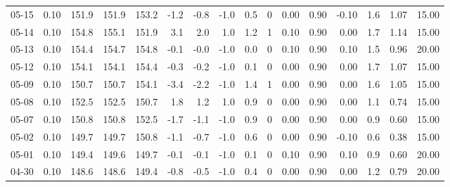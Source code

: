 \begin{threeparttable}
{\begin{tabular}{lrrrrrrrrrrrrrrr}
  05-15 &     0.10 & 151.9 & 151.9 & 153.2 &       -1.2 &           -0.8 &                     -1.0 &                 0.5 &              0 &       0.00 &      0.90 &          -0.10 &              1.6 &            1.07 &                  15.00 \\
  05-14 &     0.10 & 154.8 & 155.1 & 151.9 &        3.1 &            2.0 &                      1.0 &                 1.2 &              1 &       0.10 &      0.90 &           0.00 &              1.7 &            1.14 &                  15.00 \\
  05-13 &     0.10 & 154.4 & 154.7 & 154.8 &       -0.1 &           -0.0 &                     -1.0 &                 0.0 &              0 &       0.10 &      0.90 &           0.10 &              1.5 &            0.96 &                  20.00 \\
  05-12 &     0.10 & 154.1 & 154.1 & 154.4 &       -0.3 &           -0.2 &                     -1.0 &                 0.1 &              0 &       0.00 &      0.90 &           0.00 &              1.7 &            1.07 &                  15.00 \\
  05-09 &     0.10 & 150.7 & 150.7 & 154.1 &       -3.4 &           -2.2 &                     -1.0 &                 1.4 &              1 &       0.00 &      0.90 &           0.00 &              1.6 &            1.05 &                  15.00 \\
  05-08 &     0.10 & 152.5 & 152.5 & 150.7 &        1.8 &            1.2 &                      1.0 &                 0.9 &              0 &       0.00 &      0.90 &           0.00 &              1.1 &            0.74 &                  15.00 \\
  05-07 &     0.10 & 150.8 & 150.8 & 152.5 &       -1.7 &           -1.1 &                     -1.0 &                 0.9 &              0 &       0.00 &      0.90 &           0.00 &              0.9 &            0.60 &                  15.00 \\
  05-02 &     0.10 & 149.7 & 149.7 & 150.8 &       -1.1 &           -0.7 &                     -1.0 &                 0.6 &              0 &       0.00 &      0.90 &          -0.10 &              0.6 &            0.38 &                  15.00 \\
  05-01 &     0.10 & 149.4 & 149.6 & 149.7 &       -0.1 &           -0.1 &                     -1.0 &                 0.1 &              0 &       0.10 &      0.90 &           0.10 &              0.9 &            0.60 &                  20.00 \\
  04-30 &     0.10 & 148.6 & 148.6 & 149.4 &       -0.8 &           -0.5 &                     -1.0 &                 0.4 &              0 &       0.00 &      0.90 &           0.00 &              1.2 &            0.79 &                  20.00 \\

\end{tabular}}
\end{threeparttable}
